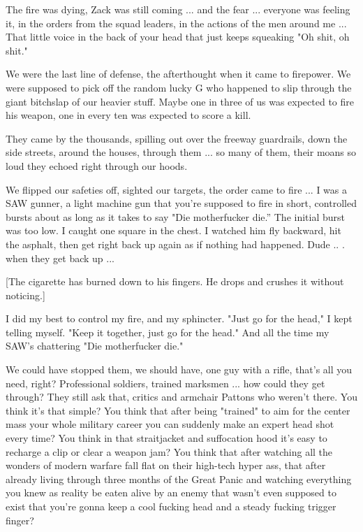 \documentclass[10pt,a4paper]{article}
\begin{document}
The fire was dying, Zack was still coming ... and the fear ... everyone was feeling it, in the orders from the squad leaders, in the actions of the men around me ... That little voice in the back of your head that just keeps squeaking "Oh shit, oh shit."

We were the last line of defense, the afterthought when it came to firepower. We were supposed to pick off the random lucky G who happened to slip through the giant bitchslap of our heavier stuff. Maybe one in three of us was expected to fire his weapon, one in every ten was expected to score a kill.

They came by the thousands, spilling out over the freeway guardrails, down the side streets, around the houses, through them ... so many of them, their moans so loud they echoed right through our hoods.

We flipped our safeties off, sighted our targets, the order came to fire ... I was a SAW gunner, a light machine gun that you're supposed to fire in short, controlled bursts about as long as it takes to say "Die motherfucker die.” The initial burst was too low. I caught one square in the chest. I watched him fly backward, hit the asphalt, then get right back up again as if nothing had happened. Dude .. . when they get back up ...

[The cigarette has burned down to his fingers. He drops and crushes it without noticing.]

I did my best to control my fire, and my sphincter. "Just go for the head," I kept telling myself. "Keep it together, just go for the head." And all the time my SAW's chattering "Die motherfucker die."

We could have stopped them, we should have, one guy with a rifle, that's all you need, right? Professional soldiers, trained marksmen ... how could they get through? They still ask that, critics and armchair Pattons who weren't there. You think it's that simple? You think that after being "trained" to aim for the center mass your whole military career you can suddenly make an expert head shot every time? You think in that straitjacket and suffocation hood it's easy to recharge a clip or clear a weapon jam? You think that after watching all the wonders of modern warfare fall flat on their high-tech hyper ass, that after already living through three months of the Great Panic and watching everything you knew as reality be eaten alive by an enemy that wasn't even supposed to exist that you're gonna keep a cool fucking head and a steady fucking trigger finger?
\end{document}
